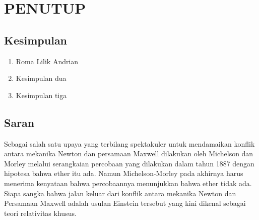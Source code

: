 \chapter{PENUTUP}

\section{Kesimpulan}
\begin{enumerate}
\item Roma Lilik Andrian
\item Kesimpulan dua
\item Kesimpulan tiga
\end{enumerate}  

\section{Saran}
Sebagai salah satu upaya yang terbilang spektakuler untuk mendamaikan konflik antara mekanika Newton dan persamaan Maxwell dilakukan oleh Michelson dan Morley melalui serangkaian percobaan yang dilakukan dalam tahun 1887 dengan hipotesa bahwa ether itu ada. Namun Michelson-Morley pada akhirnya harus menerima kenyataan bahwa percobaannya menunjukkan bahwa ether tidak ada. Siapa sangka bahwa jalan keluar dari konflik antara mekanika Newton dan Persamaan Maxwell adalah usulan Einstein tersebut yang kini dikenal sebagai teori relativitas khusus.

